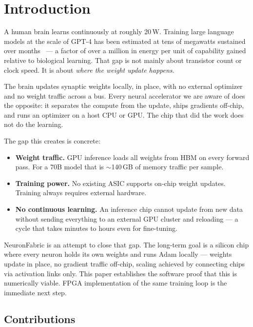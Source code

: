 \documentclass[11pt]{article}
\begin{document}
\section{Introduction}

A human brain learns continuously at roughly 20\,W.
Training large language models at the scale of GPT-4 has been estimated at tens of megawatts
sustained over months~\cite{patterson2022carbon} --- a factor of over a million in energy
per unit of capability gained relative to biological learning.
That gap is not mainly about transistor count or clock speed.
It is about \emph{where the weight update happens}.

The brain updates synaptic weights locally, in place, with no external optimizer and
no weight traffic across a bus. Every neural accelerator we are aware of does the
opposite: it separates the compute from the update, ships gradients off-chip, and
runs an optimizer on a host CPU or GPU. The chip that did the work does not do the learning.

The gap this creates is concrete:

\begin{itemize}
  \item \textbf{Weight traffic.} GPU inference loads all weights from HBM on every
    forward pass. For a 70B model that is $\sim$140\,GB of memory traffic per sample.
  \item \textbf{Training power.} No existing ASIC supports on-chip weight updates.
    Training always requires external hardware.
  \item \textbf{No continuous learning.} An inference chip cannot update from new data
    without sending everything to an external GPU cluster and reloading --- a cycle
    that takes minutes to hours even for fine-tuning.
\end{itemize}

NeuronFabric is an attempt to close that gap. The long-term goal is a silicon chip
where every neuron holds its own weights and runs Adam locally --- weights update in
place, no gradient traffic off-chip, scaling achieved by connecting chips via
activation links only. This paper establishes the software proof that
this is numerically viable. FPGA implementation of the same training loop is the immediate next step.

\subsection{Contributions}
\end{document}
